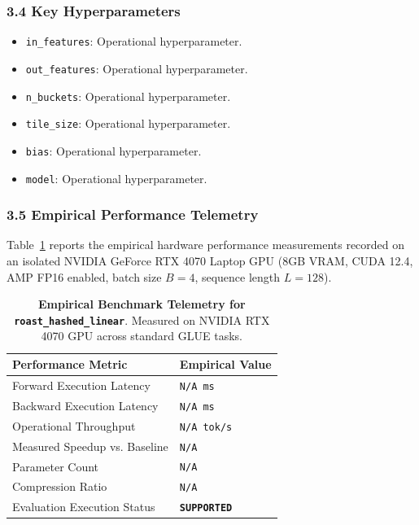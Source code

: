\subsubsection*{3.4 Key Hyperparameters}
\begin{itemize}
    \item \texttt{in\_features}: Operational hyperparameter.
    \item \texttt{out\_features}: Operational hyperparameter.
    \item \texttt{n\_buckets}: Operational hyperparameter.
    \item \texttt{tile\_size}: Operational hyperparameter.
    \item \texttt{bias}: Operational hyperparameter.
    \item \texttt{model}: Operational hyperparameter.
\end{itemize}

\subsubsection*{3.5 Empirical Performance Telemetry}
Table~\ref{tab:telemetry_roast\_hashed\_linear} reports the empirical hardware performance measurements recorded on an isolated NVIDIA GeForce RTX 4070 Laptop GPU (8GB VRAM, CUDA 12.4, AMP FP16 enabled, batch size $B=4$, sequence length $L=128$).

\begin{table}[h]
\centering
\small
\caption{\textbf{Empirical Benchmark Telemetry for \texttt{roast\_hashed\_linear}}. Measured on NVIDIA RTX 4070 GPU across standard GLUE tasks.}
\label{tab:telemetry_roast\_hashed\_linear}
\begin{tabularx}{\columnwidth}{lX}
\toprule
\textbf{Performance Metric} & \textbf{Empirical Value} \\
\midrule
Forward Execution Latency & \texttt{N/A ms} \\
Backward Execution Latency & \texttt{N/A ms} \\
Operational Throughput & \texttt{N/A tok/s} \\
Measured Speedup vs. Baseline & \texttt{N/A} \\
Parameter Count & \texttt{N/A} \\
Compression Ratio & \texttt{N/A} \\
Evaluation Execution Status & \textbf{\texttt{SUPPORTED}} \\
\bottomrule
\end{tabularx}
\end{table}

